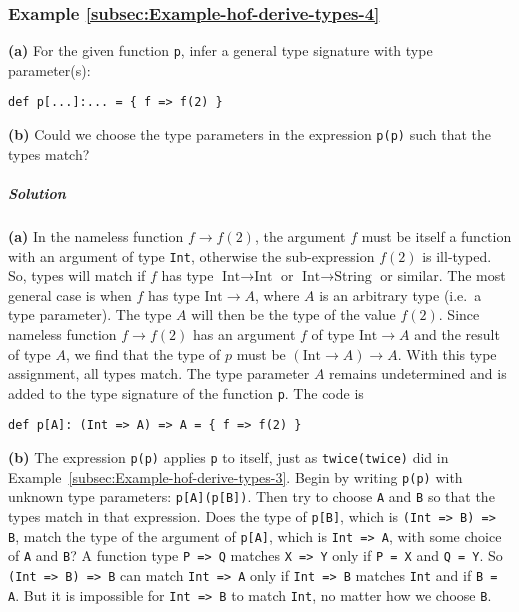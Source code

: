 \subsubsection{Example \label{subsec:Example-hof-derive-types-4}\ref{subsec:Example-hof-derive-types-4}}

\textbf{(a)} For the given function \lstinline!p!, infer a general
type signature with type parameter(s):
\begin{lstlisting}
def p[...]:... = { f => f(2) }
\end{lstlisting}
\textbf{(b)} Could we choose the type parameters in the expression
\lstinline!p(p)! such that the types match?

\subparagraph{Solution}

\textbf{(a)} In the nameless function $f\rightarrow f(2)$, the argument
$f$ must be itself a function with an argument of type \lstinline!Int!,
otherwise the sub-expression $f(2)$ is ill-typed. So, types will
match if $f$ has type $\text{Int}\rightarrow\text{Int}$ or $\text{Int}\rightarrow\text{String}$
or similar. The most general case is when $f$ has type $\text{Int}\rightarrow A$,
where $A$ is an arbitrary type (i.e.~a type parameter). The type
$A$ will then be the type of the value $f(2)$. Since nameless function
$f\rightarrow f(2)$ has an argument $f$ of type $\text{Int}\rightarrow A$
and the result of type $A$, we find that the type of $p$ must be
$\left(\text{Int}\rightarrow A\right)\rightarrow A$. With this type
assignment, all types match. The type parameter $A$ remains undetermined
and is added to the type signature of the function \lstinline!p!.
The code is
\begin{lstlisting}
def p[A]: (Int => A) => A = { f => f(2) }
\end{lstlisting}

\textbf{(b)} The expression \lstinline!p(p)! applies \lstinline!p!
to itself, just as \lstinline!twice(twice)! did in Example~\ref{subsec:Example-hof-derive-types-3}.
Begin by writing \lstinline!p(p)! with unknown type parameters: \lstinline!p[A](p[B])!.
Then  try to choose \lstinline!A! and \lstinline!B! so that the
types match in that expression. Does the type of \lstinline!p[B]!,
which is \lstinline!(Int => B) => B!, match the type of the argument
of \lstinline!p[A]!, which is \lstinline!Int => A!, with some choice
of \lstinline!A! and \lstinline!B!? A function type \lstinline!P => Q!
matches \lstinline!X => Y! only if \lstinline!P = X! and \lstinline!Q = Y!.
So \lstinline!(Int => B) => B! can match \lstinline!Int => A! only
if \lstinline!Int => B! matches \lstinline!Int! and if \lstinline!B = A!.
But it is impossible for \lstinline!Int => B! to match \lstinline!Int!,
no matter how we choose \lstinline!B!. 


